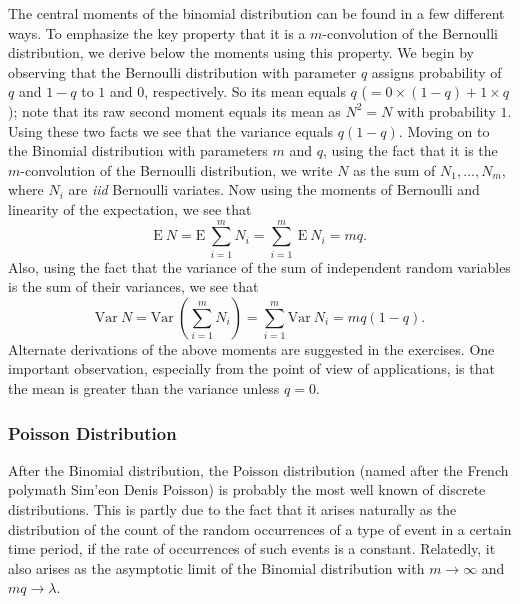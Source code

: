 \documentclass[]{book}
\theoremstyle{definition}
\theoremstyle{definition}
\theoremstyle{definition}
\theoremstyle{remark}
\begin{document}
The central moments of the binomial distribution can be found in a few
different ways. To emphasize the key property that it is a
\(m\)-convolution of the Bernoulli distribution, we derive below the
moments using this property. We begin by observing that the Bernoulli
distribution with parameter \(q\) assigns probability of \(q\) and
\(1-q\) to \(1\) and \(0\), respectively. So its mean equals \(q\)
(\(=0\times (1-q) + 1\times q\)); note that its raw second moment equals
its mean as \(N^2=N\) with probability \(1\). Using these two facts we
see that the variance equals \(q(1-q)\). Moving on to the Binomial
distribution with parameters \(m\) and \(q\), using the fact that it is
the \(m\)-convolution of the Bernoulli distribution, we write \(N\) as
the sum of \(N_1,\ldots,N_m\), where \(N_i\) are \emph{iid} Bernoulli
variates. Now using the moments of Bernoulli and linearity of the
expectation, we see that \[
\mathrm{E}~{N}=\mathrm{E}~{\sum_{i=1}^m N_i} = \sum_{i=1}^m ~\mathrm{E}~{N_i} = mq.
\] Also, using the fact that the variance of the sum of independent
random variables is the sum of their variances, we see that\\
\[
\mathrm{Var}~{N}=\mathrm{Var}~\left({\sum_{i=1}^m N_i}\right)=\sum_{i=1}^m \mathrm{Var}~{N_i} = mq(1-q).
\] Alternate derivations of the above moments are suggested in the
exercises. One important observation, especially from the point of view
of applications, is that the mean is greater than the variance unless
\(q=0\).

\subsubsection{Poisson Distribution}\label{S:poisson-distribution}

After the Binomial distribution, the Poisson distribution (named after
the French polymath Sim'eon Denis Poisson) is probably the most well
known of discrete distributions. This is partly due to the fact that it
arises naturally as the distribution of the count of the random
occurrences of a type of event in a certain time period, if the rate of
occurrences of such events is a constant. Relatedly, it also arises as
the asymptotic limit of the Binomial distribution with
\(m\rightarrow \infty\) and \(mq\rightarrow \lambda\).
\end{document}
